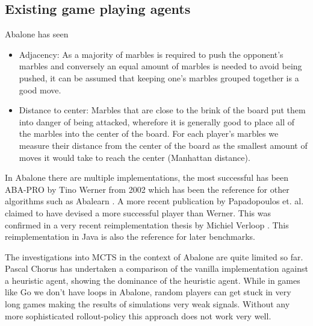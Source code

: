 \subsection{Existing game playing agents}
Abalone has seen

\begin{itemize}
    \item Adjacency: As a majority of marbles is required to push the opponent's marbles and conversely an equal amount of marbles is needed to avoid being pushed, it can be assumed that keeping one's marbles grouped together is a good move.
    \item Distance to center: Marbles that are close to the brink of the board put them into danger of being attacked, wherefore it is generally good to place all of the marbles into the center of the board. For each player's marbles we measure their distance from the center of the board as the smallest amount of moves it would take to reach the center (Manhattan distance).
\end{itemize}
In Abalone there are multiple implementations, the most successful has been ABA-PRO by Tino Werner from 2002 \cite{aichholzer_algorithmic_2002} which has been the reference for other algorithms such as Abalearn \cite{campos_abalearn_2003}. A more recent publication by Papadopoulos et. al. claimed to have devised a more successful player than Werner. \cite{papadopoulos_exploring_2012} This was confirmed in a very recent reimplementation thesis by Michiel Verloop \cite{verloop_critical_nodate}. This reimplementation in Java \cite{verloop_abaloneai_nodate} is also the reference for later benchmarks.

The investigations into MCTS in the context of Abalone are quite limited so far. Pascal Chorus has undertaken a comparison of the vanilla implementation against a heuristic agent, showing the dominance of the heuristic agent. \cite{chorus_implementing_2009} While in games like Go we don't have loops in Abalone, random players can get stuck in very long games making the results of simulations very weak signals. Without any more sophisticated rollout-policy this approach does not work very well.